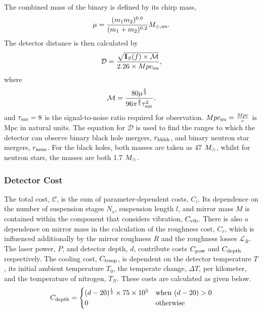 \documentclass{article}
\begin{document}
    The combined mass of the binary is defined by its chirp mass,
    \begin{equation}
    \mu = \frac{(m_1m_2)^{0.6}}{(m_1 + m_2)^{0.2}}M_{\rm \odot,nu}.
    \end{equation}
    The detector distance is then calculated by
    \begin{equation}
    \mathcal{D} = \frac{\sqrt{\mathbf{I}_S(f) \times \mathcal{M}}}{2.26 \times Mpc_{\rm nu}},
    \end{equation}
    where
    \begin{equation}
    \mathcal{M} = \frac{80\mu^{\frac{5}{3}}}{96\pi^{\frac{4}{3}}\tau_{\rm snr}^2}.
    \end{equation}
   and $\tau_{\rm snr} = 8$ is the signal-to-noise ratio required for
   observation. $Mpc_{\rm nu} = \frac{Mpc}{c}$ is Mpc in natural
   units. The equation for $\mathcal{D}$ is used to find the ranges to
   which the detector can observe binary black hole mergers,
   $r_{\rm bhbh}$, and binary neutron star mergers, $r_{\rm nsns}$. For the
   black holes, both masses are taken as 47 $M_{\rm \odot}$, whilst for
   neutron stars, the masses are both 1.7 $M_{\rm \odot}$.

\subsubsection*{Detector Cost}
The total cost, $\mathcal{C}$, is the sum of parameter-dependent
costs, $C_i$. Its dependence on the number of suspension stages $N_s$,
suspension length $l$, and mirror mass $M$ is contained within the
component that considers vibration, $C_{\rm vib}$. There is also a
dependence on mirror mass in the calculation of the roughness cost,
$C_r$, which is influenced additionally by the mirror roughness $R$
and the roughness losses $\mathcal{L}_R$. The laser power, $P$, and
detector depth, $d$, contribute costs $C_{\rm pow}$ and $C_{\rm depth}$
respectively. The cooling cost, $C_{\rm temp}$, is dependent on the
detector temperature $T$, its initial ambient temperature $T_0$, the
temperate change, $\Delta T$, per kilometer, and the temperature of
nitrogen, $T_N$. These costs are calculated as given below.
    \begin{equation}C_{\rm depth} = \begin{cases}
                  (d-20)^{\frac{1}{3}} \times 75 \times 10^5 & \text{when $(d-20) > 0$} \\
                  0 & \text{otherwise}
                  \end{cases}
    \end{equation}
    
\end{document}
